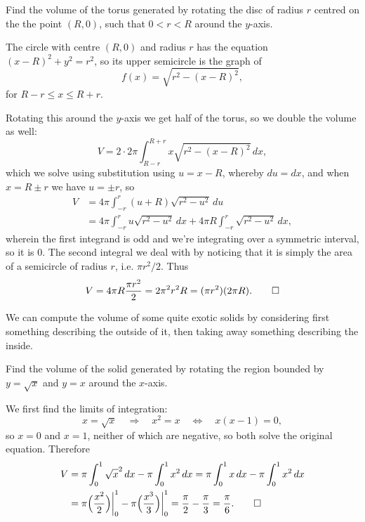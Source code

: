 \begin{example}
	Find the volume of the torus generated by rotating the disc of radius $r$ centred on the the point $(R, 0)$, such that $0 < r < R$ around the $y$-axis.

	The circle with centre $(R, 0)$ and radius $r$ has the equation $(x - R)^2 + y^2 = r^2$, so its upper semicircle is the graph of
	\[
		f(x) = \sqrt{r^2 - (x - R)^2},
	\]
	for $R - r \leq x \leq R + r$.

	Rotating this around the $y$-axis we get half of the torus, so we double the volume as well:
	\[
		V = 2 \cdot 2 \pi \int_{R - r}^{R + r} x \sqrt{r^2 - (x - R)^2} \, d x,
	\]
	which we solve using substitution using $u = x - R$, whereby $d u = d x$, and when $x = R \pm r$ we have $u = \pm r$, so
	\begin{align*}
		V &= 4 \pi \int_{-r}^r (u + R) \sqrt{r^2 - u^2} \, d u \\
		  &= 4 \pi \int_{-r}^r u \sqrt{r^2 - u^2} \, d x + 4 \pi R \int_{-r}^r \sqrt{r^2 - u^2} \, d x,
	\end{align*}
	wherein the first integrand is odd and we're integrating over a symmetric interval, so it is $0$.
	The second integral we deal with by noticing that it is simply the area of a semicircle of radius $r$, i.e. $\pi r^2 / 2$.
	Thus
	\[
		V = 4 \pi R \frac{\pi r^2}{2} = 2 \pi^2 r^2 R = (\pi r^2) (2 \pi R). \qedhere
	\]
\end{example}

\noindent
We can compute the volume of some quite exotic solids by considering first something describing the outside of it, then taking away something describing the inside.

\begin{example}
	Find the volume of the solid generated by rotating the region bounded by $y = \sqrt{x}$ and $y = x$ around the $x$-axis.

	We first find the limits of integration:
	\[
		x = \sqrt{x} \quad\Rightarrow\quad x^2 = x \quad\Leftrightarrow\quad x(x - 1) = 0,
	\]
	so $x = 0$ and $x = 1$, neither of which are negative, so both solve the original equation.
	Therefore
	\begin{align*}
		V &= \pi \int_0^1 \sqrt{x}^2 \, d x - \pi \int_0^1 x^2 \, d x = \pi \int_0^1 x \, d x - \pi \int_0^1 x^2 \, d x \\
		  &= \pi \Big ( \frac{x^2}{2} \Big ) \biggr \rvert_0^1 - \pi \Big ( \frac{x^3}{3} \Big ) \biggr \rvert_0^1 = \frac{\pi}{2} - \frac{\pi}{3} = \frac{\pi}{6}. \qedhere
	\end{align*}
\end{example}

